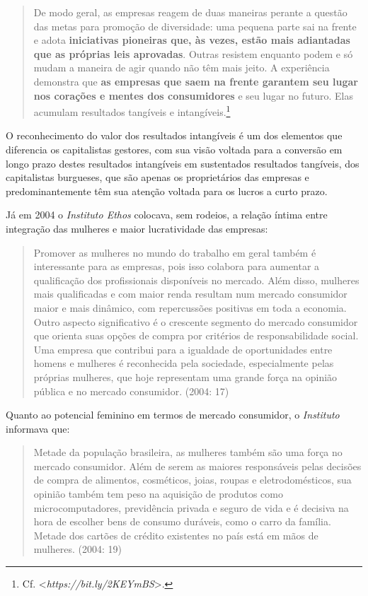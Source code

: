 \begin{quote}
De modo geral, as empresas reagem de duas maneiras perante a questão das
metas para promoção de diversidade: uma pequena parte sai na frente e
adota \textbf{iniciativas pioneiras que, às vezes, estão mais adiantadas
que as próprias leis aprovadas}. Outras resistem enquanto podem e só
mudam a maneira de agir quando não têm mais jeito. A experiência
demonstra que \textbf{as empresas que saem na frente garantem seu lugar
nos corações e mentes dos consumidores} e seu lugar no futuro. Elas
acumulam resultados tangíveis e intangíveis.\footnote{Cf.
  \textless{}\emph{https://bit.ly/2KEYmBS}\textgreater{}.}
\end{quote}

O reconhecimento do valor dos resultados intangíveis é um dos elementos
que diferencia os capitalistas gestores, com sua visão voltada para a
conversão em longo prazo destes resultados intangíveis em sustentados
resultados tangíveis, dos capitalistas burgueses, que são apenas os
proprietários das empresas e predominantemente têm sua atenção voltada
para os lucros a curto prazo.

Já em 2004 o \emph{Instituto Ethos} colocava, sem rodeios, a relação
íntima entre integração das mulheres e maior lucratividade das empresas:

\begin{quote}
Promover as mulheres no mundo do trabalho em geral também é interessante
para as empresas, pois isso colabora para aumentar a qualificação dos
profissionais disponíveis no mercado. Além disso, mulheres mais
qualificadas e com maior renda resultam num mercado consumidor maior e
mais dinâmico, com repercussões positivas em toda a economia. Outro
aspecto significativo é o crescente segmento do mercado consumidor que
orienta suas opções de compra por critérios de responsabilidade social.
Uma empresa que contribui para a igualdade de oportunidades entre homens
e mulheres é reconhecida pela sociedade, especialmente pelas próprias
mulheres, que hoje representam uma grande força na opinião pública e no
mercado consumidor. (2004: 17)
\end{quote}

Quanto ao potencial feminino em termos de mercado consumidor, o
\emph{Instituto} informava que:

\begin{quote}
Metade da população brasileira, as mulheres também são uma força no
mercado consumidor. Além de serem as maiores responsáveis pelas decisões
de compra de alimentos, cosméticos, joias, roupas e eletrodomésticos,
sua opinião também tem peso na aquisição de produtos como
microcomputadores, previdência privada e seguro de vida e é decisiva na
hora de escolher bens de consumo duráveis, como o carro da família.
Metade dos cartões de crédito existentes no país está em mãos de
mulheres. (2004: 19)
\end{quote}

